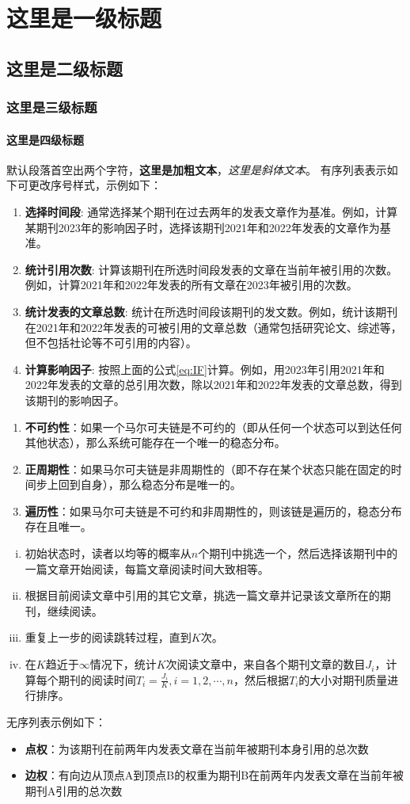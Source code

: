 \chapter{这里是一级标题}
\section{这里是二级标题}
\subsection{这里是三级标题}
\subsubsection{这里是四级标题}
默认段落首空出两个字符，\textbf{这里是加粗文本}，\textit{这里是斜体文本}。
有序列表表示如下可更改序号样式，示例如下：
\begin{enumerate}[(1)]
    \item \textbf{选择时间段}: 通常选择某个期刊在过去两年的发表文章作为基准。例如，计算某期刊2023年的影响因子时，选择该期刊2021年和2022年发表的文章作为基准。
    \item \textbf{统计引用次数}: 计算该期刊在所选时间段发表的文章在当前年被引用的次数。例如，计算2021年和2022年发表的所有文章在2023年被引用的次数。
    \item \textbf{统计发表的文章总数}: 统计在所选时间段该期刊的发文数。例如，统计该期刊在2021年和2022年发表的可被引用的文章总数（通常包括研究论文、综述等，但不包括社论等不可引用的内容）。
    \item \textbf{计算影响因子}: 按照上面的公式\ref{eq:IF}计算。例如，用2023年引用2021年和2022年发表的文章的总引用次数，除以2021年和2022年发表的文章总数，得到该期刊的影响因子。
\end{enumerate}
\begin{enumerate}
    \item \textbf{不可约性}：如果一个马尔可夫链是不可约的（即从任何一个状态可以到达任何其他状态），那么系统可能存在一个唯一的稳态分布。
    \item \textbf{正周期性}：如果马尔可夫链是非周期性的（即不存在某个状态只能在固定的时间步上回到自身），那么稳态分布是唯一的。
    \item  \textbf{遍历性}：如果马尔可夫链是不可约和非周期性的，则该链是遍历的，稳态分布存在且唯一。
\end{enumerate}
\begin{enumerate}[i)]
    \item 初始状态时，读者以均等的概率从$n$个期刊中挑选一个，然后选择该期刊中的一篇文章开始阅读，每篇文章阅读时间大致相等。
    \item 根据目前阅读文章中引用的其它文章，挑选一篇文章并记录该文章所在的期刊，继续阅读。
    \item 重复上一步的阅读跳转过程，直到$K$次。
    \item 在$K$趋近于$\infty$情况下，统计$K$次阅读文章中，来自各个期刊文章的数目$J_i$，计算每个期刊的阅读时间$T_i=\frac{J_i}{K}, i=1,2,\cdots,n$，然后根据$T_i$的大小对期刊质量进行排序。
\end{enumerate}
无序列表示例如下：
\begin{itemize}
    \item \textbf{点权}：为该期刊在前两年内发表文章在当前年被期刊本身引用的总次数
    \item \textbf{边权}：有向边从顶点A到顶点B的权重为期刊B在前两年内发表文章在当前年被期刊A引用的总次数
\end{itemize}